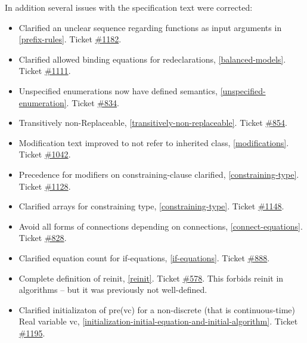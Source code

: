 In addition several issues with the specification text were corrected:

\begin{itemize}
\item
  Clarified an unclear sequence regarding functions as input arguments
  in \autoref{prefix-rules}. Ticket
  \href{https://github.com/modelica/ModelicaSpecification/issues/1182}{\#1182}.
\item
  Clarified allowed binding equations for redeclarations, \autoref{balanced-models}.
  Ticket \href{https://github.com/modelica/ModelicaSpecification/issues/1111}{\#1111}.
\item
  Unspecified enumerations now have defined semantics, \autoref{unspecified-enumeration}.
  Ticket \href{https://github.com/modelica/ModelicaSpecification/issues/834}{\#834}.
\item
  Transitively non-Replaceable, \autoref{transitively-non-replaceable}. Ticket
  \href{https://github.com/modelica/ModelicaSpecification/issues/854}{\#854}.
\item
  Modification text improved to not refer to inherited class,
  \autoref{modifications}. Ticket
  \href{https://github.com/modelica/ModelicaSpecification/issues/1042}{\#1042}.
\item
  Precedence for modifiers on constraining-clause clarified, \autoref{constraining-type}. Ticket
  \href{https://github.com/modelica/ModelicaSpecification/issues/1128}{\#1128}.
\item
  Clarified arrays for constraining type, \autoref{constraining-type}. Ticket
  \href{https://github.com/modelica/ModelicaSpecification/issues/1148}{\#1148}.
\item
  Avoid all forms of connections depending on connections,
  \autoref{connect-equations}. Ticket
  \href{https://github.com/modelica/ModelicaSpecification/issues/828}{\#828}.
\item
  Clarified equation count for if-equations, \autoref{if-equations}. Ticket
  \href{https://github.com/modelica/ModelicaSpecification/issues/888}{\#888}.
\item
  Complete definition of reinit, \autoref{reinit}. Ticket
  \href{https://github.com/modelica/ModelicaSpecification/issues/578}{\#578}. This
  forbids reinit in algorithms -- but it was previously not
  well-defined.
\item
  Clarified initializaton of pre(vc) for a non-discrete (that is
  continuous-time) Real variable vc, \autoref{initialization-initial-equation-and-initial-algorithm}. Ticket
  \href{https://github.com/modelica/ModelicaSpecification/issues/1195}{\#1195}.

\end{itemize}
